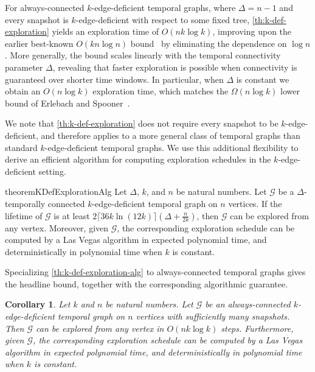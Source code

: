 \documentclass[a4paper,11pt]{article}
\newtheorem{corollary}[theorem]{Corollary}
\theoremstyle{definition}
\theoremstyle{remark}
\newcommand{\cG}{\ensuremath{\mathcal{G}}}
\begin{document}
    For always-connected $k$-edge-deficient temporal graphs, where $\Delta = n-1$ and every snapshot is $k$-edge-deficient with respect to some fixed tree, \cref{th:k-def-exploration} yields an
    exploration time of $O(nk \log k)$, improving upon the earlier best-known $O(kn \log n)$ bound~\cite{ES22} by eliminating the dependence on $\log n$. More generally, the bound scales linearly with the temporal connectivity parameter $\Delta$, revealing that faster exploration is possible when connectivity is guaranteed over shorter time windows. In particular, when $\Delta$ is constant we obtain an $O(n \log k)$ exploration time, which matches the $\Omega(n \log k)$ lower bound of Erlebach and Spooner~\cite{ES22}.

    We note that \cref{th:k-def-exploration} does not require every snapshot to be $k$-edge-deficient, and therefore applies to a more general class of temporal graphs than standard $k$-edge-deficient temporal graphs. We use this additional flexibility to derive an efficient algorithm for computing exploration schedules in the $k$-edge-deficient setting.

    \begin{restatable}{theorem}{KDefExplorationAlg}
        \label{th:k-def-exploration-alg}
        Let $\Delta$, $k$, and $n$ be natural numbers.
        Let $\cG$ be a $\Delta$-temporally connected $k$-edge-deficient temporal graph on $n$ vertices. If the lifetime of $\cG$ is at least
        $2\lceil 36k \ln{(12k)} \rceil(\Delta+ \frac{n}{2k})$,
        then $\cG$ can be explored from any vertex. Moreover, given $\cG$, the corresponding exploration schedule can be computed by a Las Vegas algorithm in expected polynomial time, and deterministically in polynomial time when $k$ is constant.
    \end{restatable}

    Specializing \cref{th:k-def-exploration-alg} to always-connected temporal graphs gives the headline bound, together with the corresponding algorithmic guarantee.

    \begin{corollary}\label{cor:k-deficient-always-connected}
        Let $k$ and $n$ be natural numbers. Let $\cG$ be an always-connected $k$-edge-deficient temporal graph on $n$ vertices with sufficiently many snapshots.
        Then $\cG$ can be explored from any vertex in $O(n k \log k)$ steps. Furthermore, given $\cG$, the corresponding exploration schedule can be computed by a Las Vegas algorithm in expected polynomial time, and deterministically in polynomial time when $k$ is constant.
    \end{corollary}
\end{document}
